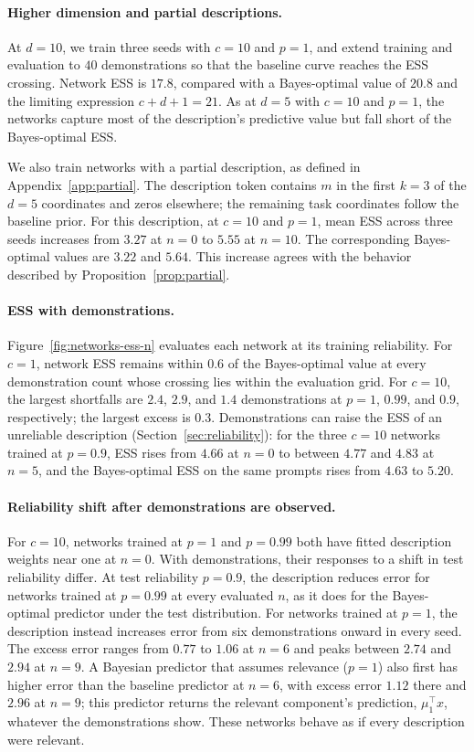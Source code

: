 \documentclass{article}
\theoremstyle{definition}
\begin{document}
\paragraph{Higher dimension and partial descriptions.}
At $d = 10$, we train three seeds with $c = 10$ and $p=1$, and extend training and evaluation to $40$ demonstrations so that the baseline curve reaches the ESS crossing. Network ESS is $17.8$, compared with a Bayes-optimal value of $20.8$ and the limiting expression $c + d + 1 = 21$. As at $d = 5$ with $c=10$ and $p=1$, the networks capture most of the description's predictive value but fall short of the Bayes-optimal ESS.

We also train networks with a partial description, as defined in Appendix~\ref{app:partial}. The description token contains $m$ in the first $k = 3$ of the $d = 5$ coordinates and zeros elsewhere; the remaining task coordinates follow the baseline prior. For this description, at $c = 10$ and $p = 1$, mean ESS across three seeds increases from $3.27$ at $n = 0$ to $5.55$ at $n = 10$. The corresponding Bayes-optimal values are $3.22$ and $5.64$. This increase agrees with the behavior described by Proposition~\ref{prop:partial}.

\paragraph{ESS with demonstrations.}
Figure~\ref{fig:networks-ess-n} evaluates each network at its training reliability. For $c = 1$, network ESS remains within $0.6$ of the Bayes-optimal value at every demonstration count whose crossing lies within the evaluation grid. For $c = 10$, the largest shortfalls are $2.4$, $2.9$, and $1.4$ demonstrations at $p = 1$, $0.99$, and $0.9$, respectively; the largest excess is $0.3$. Demonstrations can raise the ESS of an unreliable description (Section~\ref{sec:reliability}): for the three $c = 10$ networks trained at $p = 0.9$, ESS rises from $4.66$ at $n=0$ to between $4.77$ and $4.83$ at $n = 5$, and the Bayes-optimal ESS on the same prompts rises from $4.63$ to $5.20$.

\paragraph{Reliability shift after demonstrations are observed.}
For $c = 10$, networks trained at $p = 1$ and $p = 0.99$ both have fitted description weights near one at $n = 0$. With demonstrations, their responses to a shift in test reliability differ. At test reliability $p = 0.9$, the description reduces error for networks trained at $p = 0.99$ at every evaluated $n$, as it does for the Bayes-optimal predictor under the test distribution. For networks trained at $p = 1$, the description instead increases error from six demonstrations onward in every seed. The excess error ranges from $0.77$ to $1.06$ at $n = 6$ and peaks between $2.74$ and $2.94$ at $n = 9$. A Bayesian predictor that assumes relevance ($p = 1$) also first has higher error than the baseline predictor at $n = 6$, with excess error $1.12$ there and $2.96$ at $n = 9$; this predictor returns the relevant component's prediction, $\mu_1^\top x$, whatever the demonstrations show. These networks behave as if every description were relevant.
\end{document}

